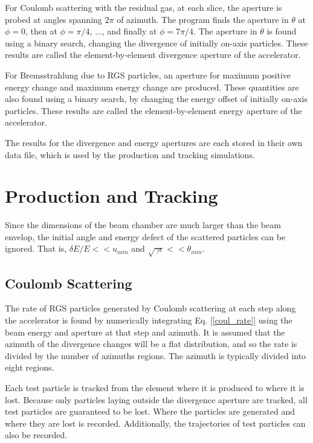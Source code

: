 \documentclass[a4paper,10pt]{article}
\begin{document}
For Coulomb scattering with the residual gas, at each slice, the aperture is probed at angles spanning $2\pi$ of azimuth.  The program finds the aperture in $\theta$ at $\phi=0$, then at $\phi=\pi/4$, ..., and finally at $\phi=7\pi/4$.  The aperture in $\theta$ is found using a binary search, changing the divergence of initially on-axis particles.  These results are called the element-by-element divergence aperture of the accelerator.

For Bremsstrahlung due to RGS particles, an aperture for maximum positive energy change and maximum energy change are produced.  These quantities
are also found using a binary search, by changing the energy offset of initially on-axis particles.  These results 
are called the element-by-element energy aperture of the accelerator.

The results for the divergence and energy apertures are each stored in their own data file, which is used by the production 
and tracking simulations.

\section{Production and Tracking}

Since the dimensions of the beam chamber are much larger than the beam envelop, the initial angle and energy defect of the scattered particles can be ignored.  That is, $\delta E/E << u_{min}$ and $\sqrt{\gamma \epsilon} << \theta_{min}$.

\subsection{Coulomb Scattering}

The rate of RGS particles generated by Coulomb scattering at each step along the accelerator is found by numerically integrating Eq.
[\ref{coul_rate}] using the beam energy and aperture at that step and azimuth.  It is assumed that the azimuth of the divergence changes will be 
a flat distribution, and so the rate is divided by the number of azimuths regions.  The azimuth is typically divided into eight regions.

Each test particle is tracked from the element where it is produced to where it is lost.  Because only particles laying outside the divergence
aperture are tracked, all test particles are guaranteed to be lost.  Where the particles are generated and where they are lost is recorded.
Additionally, the trajectories of test particles can also be recorded.
\end{document}
